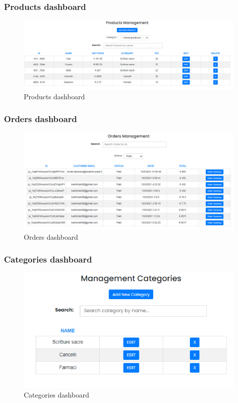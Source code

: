 \subsubsection{Products dashboard} \label{_productmanagement}
\begin{figure}[H]
    \centering
    \includegraphics[width=\linewidth]{res/images/venditore/productmanagement.png}
    \caption{Products dashboard}
\end{figure}
\subsubsection{Orders dashboard} \label{_ordermanagement}
\begin{figure}[H]
    \centering
    \includegraphics[width=\linewidth]{res/images/venditore/ordermanagement.png}
    \caption{Orders dashboard}
\end{figure}
\subsubsection{Categories dashboard} \label{_categorymanagement}
\begin{figure}[H]
    \centering
    \includegraphics[width=\linewidth]{res/images/venditore/categorymanagement.png}
    \caption{Categories dashboard}
\end{figure}
